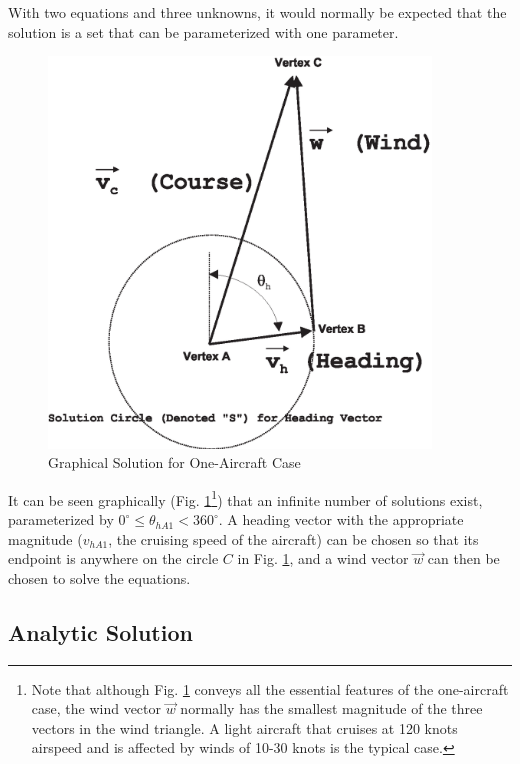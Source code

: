 \documentclass[letterpaper,10pt,titlepage]{article}
\begin{document}
With two equations and three unknowns, it would normally be expected that the solution is a
set that can be parameterized with one parameter.

\begin{figure}
\centering
\includegraphics[width=4.0in]{ac1gsl01.eps}
\caption{Graphical Solution for One-Aircraft Case}
\label{fig:ssac0:sgls0:00}
\end{figure}
  
It can be seen graphically (Fig. \ref{fig:ssac0:sgls0:00}\footnote{Note that
although Fig. \ref{fig:ssac0:sgls0:00} conveys all the essential features of
the one-aircraft case, the wind vector $\vec{w}$ normally has the smallest magnitude
of the three vectors in the wind triangle.  A light aircraft that cruises
at 120 knots airspeed and is affected by winds of 10-30 knots is the typical case.}) 
that an infinite number of solutions
exist, parameterized by $0^\circ \leq \theta_{hA1} < 360^\circ$.  
A heading vector with the appropriate magnitude
($v_{hA1}$, the cruising speed of the aircraft) can be chosen so that its endpoint is
anywhere on the circle $C$ in Fig. \ref{fig:ssac0:sgls0:00}, and a wind vector $\vec{w}$
can then be chosen to solve the equations.


\subsection{Analytic Solution}
\label{ssac0:sasl0}
\end{document}
